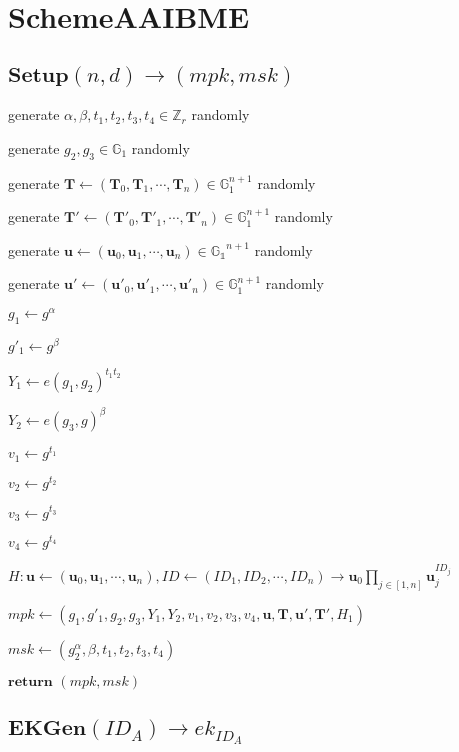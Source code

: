 \documentclass[a4paper]{article}
\begin{document}
\section{SchemeAAIBME}

\subsection{$\textbf{Setup}(n, d) \rightarrow (\textit{mpk}, \textit{msk})$}

generate $\alpha, \beta, t_1, t_2, t_3, t_4 \in \mathbb{Z}_r$ randomly

generate $g_2, g_3 \in \mathbb{G}_1$ randomly

generate $\bm{T} \gets (\bm{T}_0, \bm{T}_1, \cdots, \bm{T}_n) \in \mathbb{G}_1^{n + 1}$ randomly

generate $\bm{T}' \gets (\bm{T}'_0, \bm{T}'_1, \cdots, \bm{T}'_n) \in \mathbb{G}_1^{n + 1}$ randomly

generate $\bm{u} \gets (\bm{u}_0, \bm{u}_1, \cdots, \bm{u}_n) \in \mathbb{G_1}^{n + 1}$ randomly

generate $\bm{u}' \gets (\bm{u}'_0, \bm{u}'_1, \cdots, \bm{u}'_n) \in \mathbb{G}_1^{n + 1}$ randomly

$g_1 \gets g^\alpha$

$g'_1 \gets g^\beta$

$Y_1 \gets e(g_1, g_2)^{t_1 t_2}$

$Y_2 \gets e(g_3, g)^\beta$

$v_1 \gets g^{t_1}$

$v_2 \gets g^{t_2}$

$v_3 \gets g^{t_3}$

$v_4 \gets g^{t_4}$

$H: \bm{u} \gets (\bm{u}_0, \bm{u}_1, \cdots, \bm{u}_n), \textit{ID} \gets (\textit{ID}_1, \textit{ID}_2, \cdots, \textit{ID}_n) \rightarrow \bm{u}_0\prod\limits_{j \in [1, n]} \bm{u}_j^{\textit{ID}_j}$

$ \textit{mpk} \gets (g_1, g'_1, g_2, g_3, Y_1, Y_2, v_1, v_2, v_3, v_4, \bm{u}, \bm{T}, \bm{u}', \bm{T}', H_1)$

$\textit{msk} \gets (g_2^\alpha, \beta, t_1, t_2, t_3, t_4)$

$\textbf{return }(\textit{mpk}, \textit{msk})$

\subsection{$\textbf{EKGen}(\textit{ID}_A) \rightarrow \textit{ek}_{\textit{ID}_A}$}
\end{document}

